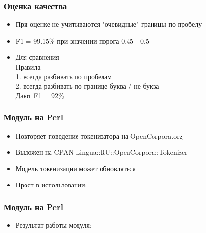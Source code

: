 \documentclass{beamer}
\begin{document}
\begin{frame}
\frametitle{Оценка качества}
\begin{itemize}
\item{При оценке не учитываются "очевидные" границы по пробелу}
\item{F1 = 99.15\% при значении порога 0.45 - 0.5}
\item{Для сравнения} \\
Правила \\
1. всегда разбивать по пробелам \\
2. всегда разбивать по границе буква / не буква \\
Дают F1 = 92\%
\end{itemize}
\end{frame}

\begin{frame}
\frametitle{Модуль на Perl}
\begin{itemize}
\item{Повторяет поведение токенизатора на OpenCorpora.org}
\item{Выложен на CPAN Lingua::RU::OpenCorpora::Tokenizer}
\item{Модель токенизации может обновляться}
\item{Прост в использовании:}
\begin{figure}
\end{figure}
\end{itemize}
\end{frame}

\begin{frame}
\frametitle{Модуль на Perl}
\begin{itemize}
\item{Результат работы модуля:}
\begin{figure}
\end{figure}
\end{itemize}
\end{frame}
\end{document}
